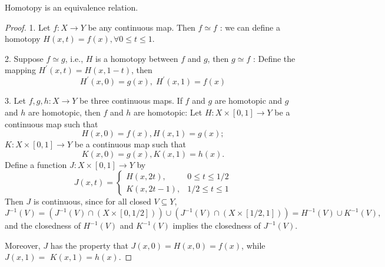 \begin{proposition} Homotopy is an equivalence relation.
\end{proposition}

\begin{proof} 1. Let \(f : X \rightarrow  Y\) be any continuous map. Then \(f \simeq  f\) : we can define a homotopy \(H\left( {x, t}\right)  = f\left( x\right), \forall 0 \leq  t \leq  1\).

2. Suppose \(f \simeq  g\), i.e., \(H\) is a homotopy between \(f\) and \(g\), then \(g \simeq  f\) : Define the mapping \({H}^{\prime }\left( {x, t}\right)  = H\left( {x, 1 - t}\right)\), then
\[
{H}^{\prime }\left( {x, 0}\right)  = g\left( x\right), \;{H}^{\prime }\left( {x, 1}\right)  = f\left( x\right)
\]

3. Let \(f, g, h : X \rightarrow  Y\) be three continuous maps. If \(f\) and \(g\) are homotopic and \(g\) and \(h\) are homotopic, then \(f\) and \(h\) are homotopic: Let \(H : X \times  \left\lbrack  {0, 1}\right\rbrack   \rightarrow  Y\) be a continuous map such that
\[
H\left( {x, 0}\right)  = f\left( x\right), H\left( {x, 1}\right)  = g\left( x\right) ;
\]
\(K : X \times  \left\lbrack  {0, 1}\right\rbrack   \rightarrow  Y\) be a continuous map such that
\[
K\left( {x, 0}\right)  = g\left( x\right), K\left( {x, 1}\right)  = h\left( x\right).
\]
Define a function \(J : X \times  \left\lbrack  {0, 1}\right\rbrack   \rightarrow  Y\) by
\[
J\left( {x, t}\right)  = \left\{  \begin{matrix} H\left( {x, {2t}}\right), & 0 \leq  t \leq  1/2 \\  K\left( {x, {2t} - 1}\right), & 1/2 \leq  t \leq  1 \end{matrix}\right.
\]
Then \(J\) is continuous, since for all closed \(V \subseteq  Y\), 
\[
{J}^{-1}\left( V\right)  = \left( {{J}^{-1}\left( V\right)  \cap  \left( {X \times  \left\lbrack  {0, 1/2}\right\rbrack  }\right) }\right)  \cup  \left( {{J}^{-1}\left( V\right)  \cap  \left( {X \times  \left\lbrack  {1/2, 1}\right\rbrack  }\right) }\right)  = {H}^{-1}\left( V\right)  \cup  {K}^{-1}\left( V\right), 
\]
and the closedness of \({H}^{-1}\left( V\right)\) and \({K}^{-1}\left( V\right)\) implies the closedness of \({J}^{-1}\left( V\right)\).

Moreover, \(J\) has the property that \(J\left( {x, 0}\right)  = H\left( {x, 0}\right)  = f\left( x\right)\), while \(J\left( {x, 1}\right)  =\)  \(K\left( {x, 1}\right)  = h\left( x\right)\).
\end{proof}


